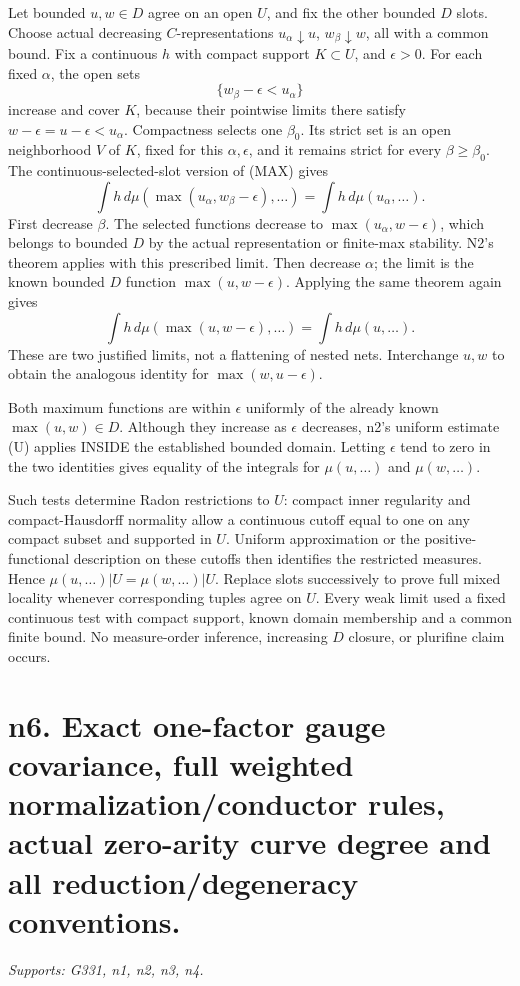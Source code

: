 \documentclass[11pt]{article}
\begin{document}
Let bounded \(u,w\in D\) agree on an open \(U\), and fix the other bounded \(D\) slots. Choose actual decreasing \(C\)-representations \(u_\alpha\downarrow u\), \(w_\beta\downarrow w\), all with a common bound. Fix a continuous \(h\) with compact support \(K\subset U\), and \(\epsilon>0\). For each fixed \(\alpha\), the open sets
\[
\{w_\beta-\epsilon<u_\alpha\}
\]
increase and cover \(K\), because their pointwise limits there satisfy \(w-\epsilon=u-\epsilon<u_\alpha\). Compactness selects one \(\beta_0\). Its strict set is an open neighborhood \(V\) of \(K\), fixed for this \(\alpha,\epsilon\), and it remains strict for every \(\beta\ge\beta_0\). The continuous-selected-slot version of (MAX) gives
\[
\int h\,d\mu(\max(u_\alpha,w_\beta-\epsilon),\ldots)
=\int h\,d\mu(u_\alpha,\ldots).
\]
First decrease \(\beta\). The selected functions decrease to \(\max(u_\alpha,w-\epsilon)\), which belongs to bounded \(D\) by the actual representation or finite-max stability. N2's theorem applies with this prescribed limit. Then decrease \(\alpha\); the limit is the known bounded \(D\) function \(\max(u,w-\epsilon)\). Applying the same theorem again gives
\[
\int h\,d\mu(\max(u,w-\epsilon),\ldots)=\int h\,d\mu(u,\ldots). \tag{L1}
\]
These are two justified limits, not a flattening of nested nets. Interchange \(u,w\) to obtain the analogous identity for \(\max(w,u-\epsilon)\).

Both maximum functions are within \(\epsilon\) uniformly of the already known \(\max(u,w)\in D\). Although they increase as \(\epsilon\) decreases, n2's uniform estimate (U) applies INSIDE the established bounded domain. Letting \(\epsilon\) tend to zero in the two identities gives equality of the integrals for \(\mu(u,\ldots)\) and \(\mu(w,\ldots)\).

Such tests determine Radon restrictions to \(U\): compact inner regularity and compact-Hausdorff normality allow a continuous cutoff equal to one on any compact subset and supported in \(U\). Uniform approximation or the positive-functional description on these cutoffs then identifies the restricted measures. Hence \(\mu(u,\ldots)|U=\mu(w,\ldots)|U\). Replace slots successively to prove full mixed locality whenever corresponding tuples agree on \(U\). Every weak limit used a fixed continuous test with compact support, known domain membership and a common finite bound. No measure-order inference, increasing \(D\) closure, or plurifine claim occurs.

\section{n6. Exact one-factor gauge covariance, full weighted normalization/conductor rules, actual zero-arity curve degree and all reduction/degeneracy conventions.}
\textit{Supports: G331, n1, n2, n3, n4.}
\end{document}
